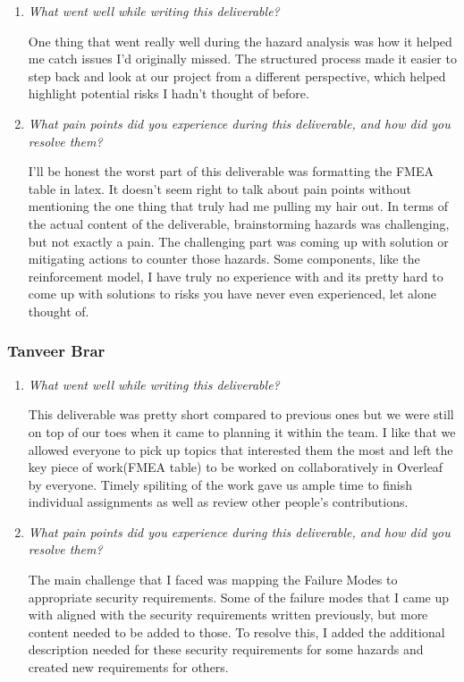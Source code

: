 \documentclass{article}
\newcounter{hazard}
\begin{document}
\begin{enumerate}
  \item \textit{What went well while writing this deliverable?}
  
  One thing that went really well during the hazard analysis was how it helped me catch issues I’d originally missed. The structured process made it easier to step back and look at our project from a different perspective, which helped highlight potential risks I hadn’t thought of before. 

  \item \textit{What pain points did you experience during this deliverable, and how did you resolve them?}
  
  I'll be honest the worst part of this deliverable was formatting the FMEA table in latex. It doesn't seem right to talk about pain points without mentioning the one thing that truly had me pulling my hair out. In terms of the actual content of the deliverable, brainstorming hazards was challenging, but not exactly a pain. The challenging part was coming up with solution or mitigating actions to counter those hazards. Some components, like the reinforcement model, I have truly no experience with and its pretty hard to come up with solutions to risks you have never even experienced, let alone thought of. 
  
\end{enumerate}

\subsubsection*{Tanveer Brar}

\begin{enumerate}
    \item \textit{What went well while writing this deliverable?}

    This deliverable was pretty short compared to previous ones but we were still on top of our toes when it came to planning it within the team. I like that we allowed everyone to pick up topics that interested them the most and left the key piece of work(FMEA table) to be worked on collaboratively in Overleaf by everyone. Timely spiliting of the work gave us ample time to finish individual assignments as well as review other people's contributions.

    \item \textit{What pain points did you experience during this deliverable, and how did you resolve them?}

    The main challenge that I faced was mapping the Failure Modes to appropriate security requirements. Some of the failure modes that I came up with aligned with the security requirements written previously, but more content needed to be added to those. To resolve this, I added the additional description needed for these security requirements for some hazards and created new requirements for others.

\end{enumerate}
\end{document}
